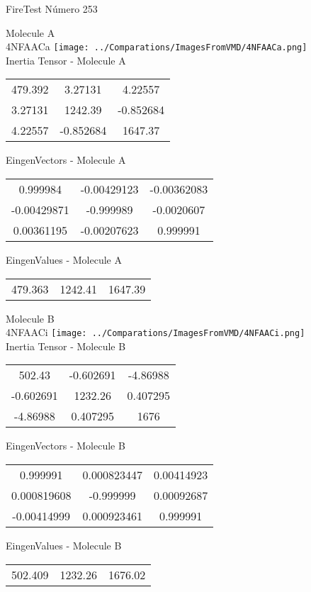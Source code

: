 \vtab[-2cm]
\begin{center}
{\large FireTest \tab Número 253}
\end{center}
\begin{multicols}{2}
\begin{center}

Molecule A \\ 
4NFAACa
\texttt{[image: ../Comparations/ImagesFromVMD/4NFAACa.png]}
\\
Inertia Tensor - Molecule A \\
\vtab

\begin{tabular}{|c c c|}
479.392	 & 	3.27131	 & 	4.22557	 \\
3.27131	 & 	1242.39	 & 	-0.852684	 \\
4.22557	 & 	-0.852684	 & 	1647.37
\end{tabular}

\vtab
 EingenVectors - Molecule A     \\
\vtab
\begin{tabular}{|c c c|}
0.999984	 & 	-0.00429123	 & 	-0.00362083	 \\
-0.00429871	 & 	-0.999989	 & 	-0.0020607	 \\
0.00361195	 & 	-0.00207623	 & 	0.999991
\end{tabular}

\vtab
 EingenValues - Molecule A     \\
\vtab
\begin{tabular}{|c c c|}
479.363	 & 	1242.41	 & 	1647.39	 \\
\end{tabular}
\columnbreak

Molecule B \\ 
4NFAACi
\texttt{[image: ../Comparations/ImagesFromVMD/4NFAACi.png]}
\\
Inertia Tensor - Molecule B \\
\vtab

\begin{tabular}{|c c c|}
502.43	 & 	-0.602691	 & 	-4.86988	 \\
-0.602691	 & 	1232.26	 & 	0.407295	 \\
-4.86988	 & 	0.407295	 & 	1676
\end{tabular}

\vtab
 EingenVectors - Molecule B     \\
\vtab
\begin{tabular}{|c c c|}
0.999991	 & 	0.000823447	 & 	0.00414923	 \\
0.000819608	 & 	-0.999999	 & 	0.00092687	 \\
-0.00414999	 & 	0.000923461	 & 	0.999991
\end{tabular}

\vtab
 EingenValues - Molecule B     \\
\vtab
\begin{tabular}{|c c c|}
502.409	 & 	1232.26	 & 	1676.02	 \\
\end{tabular}

\end{center}
\end{multicols}
